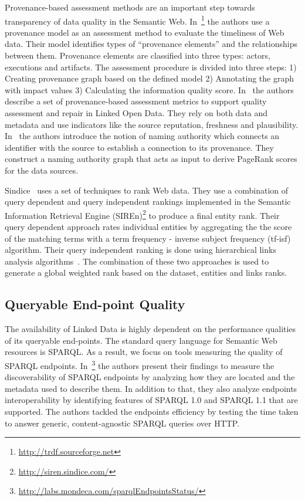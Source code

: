 \documentclass[onecolumn, crcready]{../../Tools/LaTEX/iosart2c}
\begin{document}
Provenance-based assessment methods are an important step towards transparency of data quality in the Semantic Web. In~\cite{Hartig:ISWC:09}\footnote{\url{http://trdf.sourceforge.net}} the authors use a provenance model as an assessment method to evaluate the timeliness of Web data. Their model identifies types of ``provenance elements'' and the relationships between them. Provenance elements are classified into three types: actors, executions and artifacts. The assessment procedure is divided into three steps: 1) Creating provenance graph based on the defined model 2) Annotating the graph with impact values 3) Calculating the information quality score. In~\cite{Flouris:EvoDyn:12} the authors describe a set of provenance-based assessment metrics to support quality assessment and repair in Linked Open Data. They rely on both data and metadata and use indicators like the source reputation, freshness and plausibility. In~\cite{Harth:ISWC:09} the authors introduce the notion of naming authority which connects an identifier with the source to establish a connection to its provenance. They construct a naming authority graph that acts as input to derive PageRank scores for the data sources.\\


Sindice~\cite{Tummarello:ISWC:07} uses a set of techniques to rank Web data. They use a combination of query dependent and query independent rankings implemented in the Semantic Information Retrieval Engine (SIREn)\footnote{\url{http://siren.sindice.com/}} to produce a final entity rank. Their query dependent approach rates individual entities by aggregating the the score of the matching terms with a term frequency - inverse subject frequency (tf-isf) algorithm. Their query independent ranking is done using hierarchical links analysis algorithms~\cite{Delbru:ESWC:10}. The combination of these two approaches is used to generate a global weighted rank based on the dataset, entities and links ranks.

\subsection{Queryable End-point Quality}
The availability of Linked Data is highly dependent on the performance qualities of its queryable end-points. The standard query language for Semantic Web resources is SPARQL. As a result, we focus on tools measuring the quality of SPARQL endpoints. In~\cite{BuilAranda:ISWC:13}\footnote{\url{http://labs.mondeca.com/sparqlEndpointsStatus/}} the authors present their findings to measure the discoverability of SPARQL endpoints by analyzing how they are located and the metadata used to describe them. In addition to that, they also analyze endpoints interoperability by identifying features of SPARQL 1.0 and SPARQL 1.1 that are supported. The authors tackled the endpoints efficiency by testing the time taken to answer generic, content-agnostic SPARQL queries over HTTP.
\end{document}
